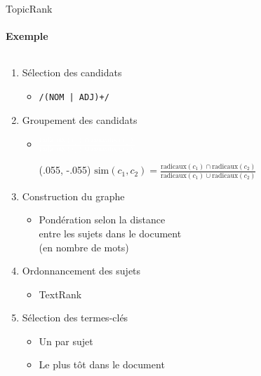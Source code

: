 \begin{frame}{TopicRank}\framesubtitle{Exemple}
  \begin{columns}
    \begin{column}{.45\linewidth}
      \begin{enumerate}\setlength{\itemindent}{-.75cm}
        \item<1->{Sélection des candidats}
          \begin{itemize}\setlength{\itemindent}{-1.1cm}
          \item{\texttt{/(NOM | ADJ)+/}}
        \end{itemize}
        \item<2->{Groupement des candidats}
        \begin{itemize}\setlength{\itemindent}{-1.1cm}
          \item{\textcolor{white}{$\frac{\text{radicaux}(c_1) \cap \text{radicaux}(c_2)}{\text{radicaux}(c_1) \cup \text{radicaux}(c_2)}$}}
          \begin{textblock*}{\textwidth}(.055\textwidth, -.055\textheight)
            $\text{sim}(c_1, c_2) = \frac{\text{radicaux}(c_1) \cap \text{radicaux}(c_2)}{\text{radicaux}(c_1) \cup \text{radicaux}(c_2)}$
          \end{textblock*}
        \end{itemize}
        \item<3->{Construction du graphe}
        \begin{itemize}\setlength{\itemindent}{-1.1cm}
          \item{
            Pondération selon la distance\\
            \hspace{-1.1cm}entre les sujets dans le document\\
            \hspace{-1.1cm}(en nombre de mots)}
        \end{itemize}
        \item<4->{Ordonnancement des sujets}
        \begin{itemize}\setlength{\itemindent}{-1.1cm}
          \item{TextRank}
        \end{itemize}
        \item<5->{Sélection des termes-clés}
        \begin{itemize}\setlength{\itemindent}{-1.1cm}
          \item{Un par sujet}
          \item{Le plus tôt dans le document}
        \end{itemize}
      \end{enumerate}
    \end{column}


\end{columns}
\end{frame}
